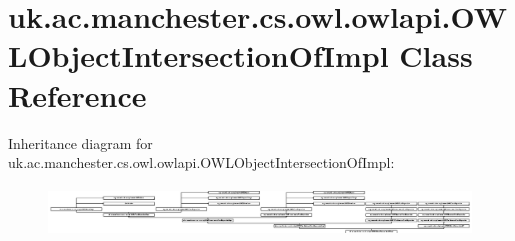\hypertarget{classuk_1_1ac_1_1manchester_1_1cs_1_1owl_1_1owlapi_1_1_o_w_l_object_intersection_of_impl}{\section{uk.\-ac.\-manchester.\-cs.\-owl.\-owlapi.\-O\-W\-L\-Object\-Intersection\-Of\-Impl Class Reference}
\label{classuk_1_1ac_1_1manchester_1_1cs_1_1owl_1_1owlapi_1_1_o_w_l_object_intersection_of_impl}
}
Inheritance diagram for uk.\-ac.\-manchester.\-cs.\-owl.\-owlapi.\-O\-W\-L\-Object\-Intersection\-Of\-Impl\-:\begin{figure}[H]
\begin{center}
\leavevmode
\includegraphics[height=1.330166cm]{classuk_1_1ac_1_1manchester_1_1cs_1_1owl_1_1owlapi_1_1_o_w_l_object_intersection_of_impl}
\end{center}
\end{figure}
